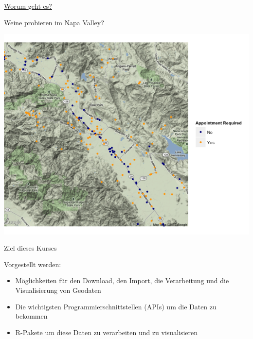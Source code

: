 \documentclass[ignorenonframetext,]{beamer}
\providecommand{\tightlist}{%
  \setlength{\itemsep}{0pt}\setlength{\parskip}{0pt}}
\begin{document}
\begin{frame}{\href{http://blog.revolutionanalytics.com/2012/07/making-beautiful-maps-in-r-with-ggmap.html}{Worum
geht es?}}

\begin{block}{Weine probieren im Napa Valley?}

\includegraphics{figure/Wine_nappa.png}

\end{block}

\end{frame}

\begin{frame}{Ziel dieses Kurses}

\begin{block}{Vorgestellt werden:}

\begin{itemize}
\tightlist
\item
  Möglichkeiten für den Download, den Import, die Verarbeitung und die
  Visualisierung von Geodaten
\end{itemize}

\begin{itemize}
\item
  Die wichtigsten Programmierschnittstellen (APIs) um die Daten zu
  bekommen
\item
  R-Pakete um diese Daten zu verarbeiten und zu visualisieren
\end{itemize}

\end{block}

\end{frame}
\end{document}
